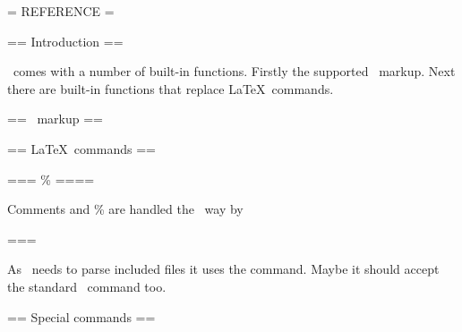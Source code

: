 
= REFERENCE =

== Introduction ==

\wikitexer\ comes with a number of built-in functions. Firstly the
supported \mediawiki\ markup. Next there are built-in functions that
replace \LaTeX\ commands. 

== \mediawiki\ markup ==

== \LaTeX\ commands ==

=== \% ====

Comments and \% are handled the \latex\ way by \wikitexer\

=== 

As \wiktexer\ needs to parse included files it uses the
 command. Maybe it should accept the standard
\ command too.

== Special commands ==
